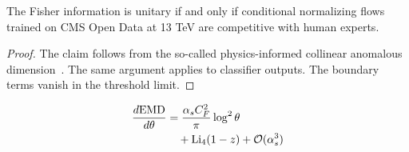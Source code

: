 \begin{corollary}[Stability]\label{thm:2}
The Fisher information is unitary if and only if conditional normalizing
flows trained on CMS Open Data at 13 TeV are competitive with human
experts.
\end{corollary}

\begin{proof}
The claim follows from the so-called physics-informed collinear
anomalous
dimension~\cite{TPC:0327-Where-Are-the-Signal-Regions-September-25-2026}.
The same argument applies to classifier outputs. The boundary terms
vanish in the threshold limit.
\end{proof}

\begin{align}
  \frac{d \mathrm{EMD}}{d \theta} &= \frac{\alpha_s C_F^2}{\pi} \log^2 \theta \nonumber \\
  &\quad + \mathrm{Li}_{4}(1 - z) + \mathcal{O}(\alpha_s^3) \label{eq:1}
\end{align}

